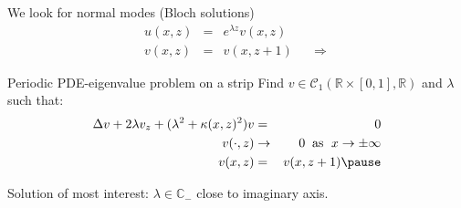 \documentclass[10pt]{beamer}
\newcommand{\RR}{\mathbb{R}}
\newcommand{\CC}{\mathbb{C}}
\begin{document}
\begin{frame}
We look for normal modes (Bloch solutions)
\begin{eqnarray*}
  u(x,z)&=&e^{\lambda z}v(x,z) \\
  v(x,z)&=&v(x,z+1)\;\;\;\;\;\Rightarrow
\end{eqnarray*}
\pause
\begin{block}{Periodic PDE-eigenvalue problem on a strip}
Find $v\in\mathcal{C}_1(\RR\times[0,1],\RR)$ and $\lambda$ such that:
\begin{eqnarray*}
\Delta v+2\lambda v_z+(\lambda^2+\kappa(x,z)^2)v&=&0\\
  v(\cdot,z)&\rightarrow& 0\;\;\textrm{as }\; x\rightarrow\pm\infty\\
  v(x,z)&=&v(x,z+1)\pause
\end{eqnarray*}
\end{block}\pause
\begin{center}

\end{center}\pause

Solution of most interest: $\lambda\in\CC_-$ close to imaginary axis.
\end{frame}
\end{document}
